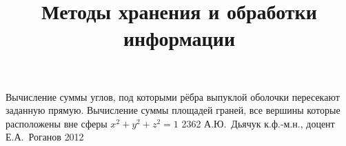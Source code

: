 \documentclass[a4paper,12pt]{memoir}
\begin{document}
\renewcommand{\contentsname}{{\Large{Оглавление}\hfill}}

\title{Методы хранения и обработки информации}
{Вычисление суммы углов, под которыми рёбра выпуклой оболочки пересекают заданную прямую. Вычисление суммы площадей граней, все вершины которые расположены вне сферы $x^2+y^2+z^2=1$}
{2362}
{А.\+Ю.~Дьячук}
{к.ф.-м.н., доцент}
{Е.\+А.~Роганов}
{2012}




\newpage

\newpage

\end{document}
